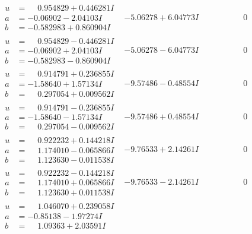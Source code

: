 \documentclass[1p]{elsarticle_modified}
\theoremstyle{definition}
\begin{document}
$$\begin{array}{c|c|c}
\begin{aligned}
u &= \phantom{-}0.954829 + 0.446281 I \\
a &= -0.06902 - 2.04103 I \\
b &= -0.582983 + 0.860904 I\end{aligned}
 & -5.06278 + 6.04773 I & \phantom{-0.000000 } 0 \\ \hline\begin{aligned}
u &= \phantom{-}0.954829 - 0.446281 I \\
a &= -0.06902 + 2.04103 I \\
b &= -0.582983 - 0.860904 I\end{aligned}
 & -5.06278 - 6.04773 I & \phantom{-0.000000 } 0 \\ \hline\begin{aligned}
u &= \phantom{-}0.914791 + 0.236855 I \\
a &= -1.58640 + 1.57134 I \\
b &= \phantom{-}0.297054 + 0.009562 I\end{aligned}
 & -9.57486 - 0.48554 I & \phantom{-0.000000 } 0 \\ \hline\begin{aligned}
u &= \phantom{-}0.914791 - 0.236855 I \\
a &= -1.58640 - 1.57134 I \\
b &= \phantom{-}0.297054 - 0.009562 I\end{aligned}
 & -9.57486 + 0.48554 I & \phantom{-0.000000 } 0 \\ \hline\begin{aligned}
u &= \phantom{-}0.922232 + 0.144218 I \\
a &= \phantom{-}1.174010 - 0.065866 I \\
b &= \phantom{-}1.123630 - 0.011538 I\end{aligned}
 & -9.76533 + 2.14261 I & \phantom{-0.000000 } 0 \\ \hline\begin{aligned}
u &= \phantom{-}0.922232 - 0.144218 I \\
a &= \phantom{-}1.174010 + 0.065866 I \\
b &= \phantom{-}1.123630 + 0.011538 I\end{aligned}
 & -9.76533 - 2.14261 I & \phantom{-0.000000 } 0 \\ \hline\begin{aligned}
u &= \phantom{-}1.046070 + 0.239058 I \\
a &= -0.85138 - 1.97274 I \\
b &= \phantom{-}1.09363 + 2.03591 I\end{aligned}

\end{array}$$
\end{document}
